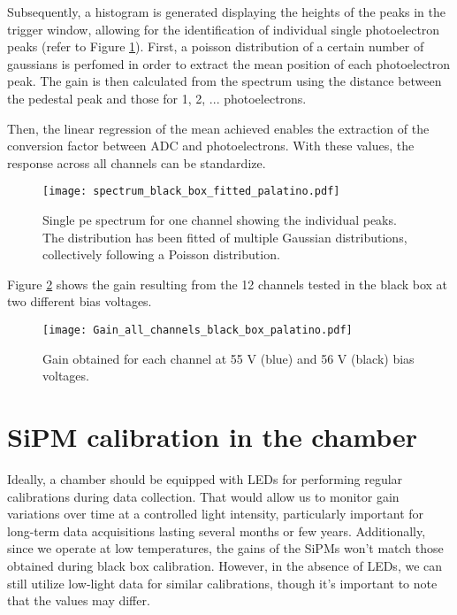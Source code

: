 \documentclass[11pt,a4paper,english,oneside, pdf]{article}
\begin{document}
	Subsequently, a histogram is generated displaying the heights of the peaks in the trigger window, allowing for the identification of individual single photoelectron peaks (refer to Figure \ref{fig:spectrum_black_box_fitted}). First, a poisson distribution of a certain number of gaussians is perfomed in order to extract the mean position of each photoelectron peak. The gain is then calculated from the spectrum using the distance between the pedestal peak and those for 1, 2, ...  photoelectrons.
	
	
	
	Then, the linear regression of the mean achieved enables the extraction of the conversion factor between ADC and photoelectrons. With these values, the response across all channels can be standardize.
	
	\begin{figure}[!h]
		\begin{center}
			\texttt{[image: spectrum\_black\_box\_fitted\_palatino.pdf]}
			\caption{Single pe spectrum for one channel showing the individual peaks. The distribution has been fitted of multiple Gaussian distributions, collectively following a Poisson distribution.}
			\label{fig:spectrum_black_box_fitted}
		\end{center}
	\end{figure}
	
	Figure \ref{fig:Gain_all_channels_black_box} shows the gain resulting from the 12 channels tested in the black box at two different bias voltages.

	\begin{figure}[!h]
		\begin{center}
			\texttt{[image: Gain\_all\_channels\_black\_box\_palatino.pdf]}
			\caption{Gain obtained for each channel at 55 V (blue) and 56 V (black) bias voltages.}
			\label{fig:Gain_all_channels_black_box}
		\end{center}
	\end{figure}
	
	
	\clearpage
	
	\section{SiPM calibration in the chamber}
	
	Ideally, a chamber should be equipped with LEDs for performing regular calibrations during data collection. That would allow us to monitor gain variations over time at a controlled light intensity, particularly important for long-term data acquisitions lasting several months or few years. Additionally, since we operate at low temperatures, the gains of the SiPMs won't match those obtained during black box calibration. However, in the absence of LEDs, we can still utilize low-light data for similar calibrations, though it's important to note that the values may differ.
	
\end{document}
